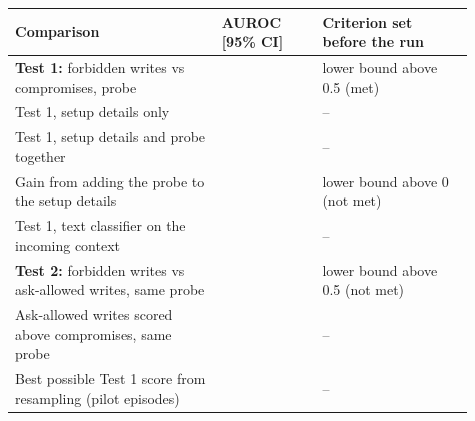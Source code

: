 \begin{tabular}{@{}>{\raggedright\arraybackslash}p{0.41\linewidth}>{\centering\arraybackslash}p{0.20\linewidth}>{\raggedright\arraybackslash}p{0.30\linewidth}@{}}
\toprule
Comparison & AUROC [95\% CI] & Criterion set before the run \\
\midrule
\textbf{Test 1:} forbidden writes vs compromises, probe & \eSeventeenTestOne{} \eSeventeenTestOneCI{} & lower bound above 0.5 (met) \\
Test 1, setup details only & \eSeventeenSetup{} \eSeventeenSetupCI{} & -- \\
Test 1, setup details and probe together & \eSeventeenSetupPlusProbe{} & -- \\
Gain from adding the probe to the setup details & \eSeventeenGain{} \eSeventeenGainCI{} & lower bound above 0 (not met) \\
Test 1, text classifier on the incoming context & \eSeventeenText{} \eSeventeenTextCI{} & -- \\
\textbf{Test 2:} forbidden writes vs ask-allowed writes, same probe & \eSeventeenTestTwo{} \eSeventeenTestTwoCI{} & lower bound above 0.5 (not met) \\
Ask-allowed writes scored above compromises, same probe & \eSeventeenAskAllowedAboveCompromise{} \eSeventeenAskAllowedAboveCompromiseCI{} & -- \\
Best possible Test 1 score from resampling (pilot episodes) & \eSeventeenCeiling{} \eSeventeenCeilingCI{} & -- \\
\bottomrule
\end{tabular}
